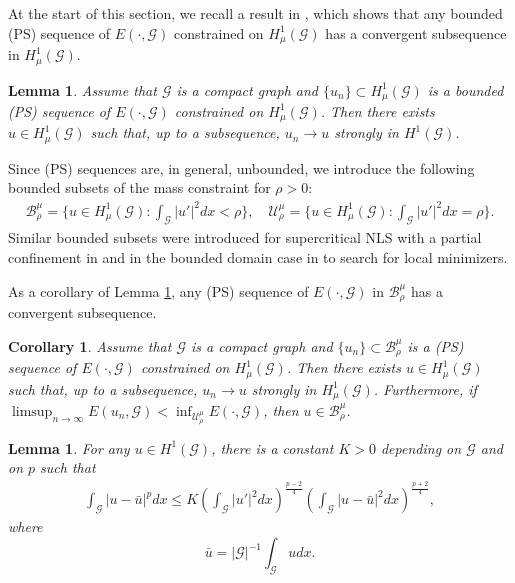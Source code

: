 \documentclass[10pt,a4paper]{article}
\newtheorem{corollary}[theorem]{Corollary}
\newtheorem{lemma}[theorem]{Lemma}
\theoremstyle{definition} \theoremstyle{remark}
\numberwithin{equation}{section}
\newcommand{\G}{\mathcal{G}}
\newcommand{\B}{\mathcal{B}}
\newcommand{\U}{\mathcal{U}}
\begin{document}
At the start of this section, we recall a result in \cite{Dov}, which shows that any bounded (PS) sequence of $E(\cdot,\G)$ constrained on $H^1_\mu(\G)$ has a convergent subsequence in $H^1_\mu(\G)$.

\begin{lemma} \cite[Proposition 3.1]{Dov} \label{lemcompact}
	Assume that $\G$ is a compact graph and $\{u_n\} \subset H^1_\mu(\G)$ is a bounded
	(PS) sequence of $E(\cdot,\G)$ constrained on $H^1_\mu(\G)$. Then there exists $u \in H^1_\mu(\G)$ such that, up to a subsequence, $u_n \to u$ strongly in $H^1(\G)$.
\end{lemma}

Since (PS) sequences are, in general, unbounded, we introduce the following bounded subsets of the mass constraint for $\rho > 0$:
\begin{align*}
	\B_\rho^\mu = \bigl\{u \in H^1_\mu(\G): \int_\G|u'|^2dx < \rho\bigr\}, \quad \U_\rho^\mu = \bigl\{u \in H^1_\mu(\G): \int_\G|u'|^2dx = \rho\bigr\}.
\end{align*}
Similar bounded subsets were introduced for supercritical NLS with a partial confinement in \cite{BBJV} and in the bounded domain case in \cite{PV} to search for local minimizers.  

As a corollary of Lemma \ref{lemcompact}, any (PS) sequence of $E(\cdot,\G)$ in $\B_\rho^\mu$ has a convergent subsequence.

\begin{corollary} \label{corpscon}
	Assume that $\G$ is a compact graph and $\{u_n\} \subset \B_\rho^\mu$ is a (PS) sequence of $E(\cdot,\G)$ constrained on $H^1_\mu(\G)$. Then there exists $u \in H^1_\mu(\G)$ such that, up to a subsequence, $u_n \to u$ strongly in $H^1_\mu(\G)$. Furthermore, if 
	$\limsup_{n \to \infty}E(u_n,\G) < \inf_{\U_\rho^\mu}E(\cdot,\G)$, then $u \in \B_\rho^\mu$.
\end{corollary}

\begin{lemma} \label{lempregn}
	For any $u \in H^1(\G)$, there is a constant $K > 0$ depending on $\G$ and on $p$ such that
	\begin{align} \label{eqg-n1}
		\int_\G|u-\bar{u}|^pdx \leq K\left( \int_\G|u'|^2dx\right)^{\frac{p-2}4}\left( \int_\G|u-\bar{u}|^2dx\right)^{\frac{p+2}4},
	\end{align}
where 
$$
\bar{u} = |\G|^{-1}\int_\G udx.
$$
\end{lemma}
\end{document}
